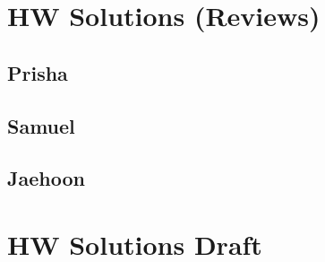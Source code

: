 




    \maketitle
    \clearpage



    \section{HW Solutions (Reviews)}
    \begin{sloppypar}
        \subsection{Prisha}\clearpage
        \subsection{Samuel}\clearpage
        \subsection{Jaehoon}\clearpage
%        
%        
%        
%        
%        
    \end{sloppypar}\clearpage





    \section{HW Solutions Draft}
    \begin{sloppypar}
    \end{sloppypar}
    
